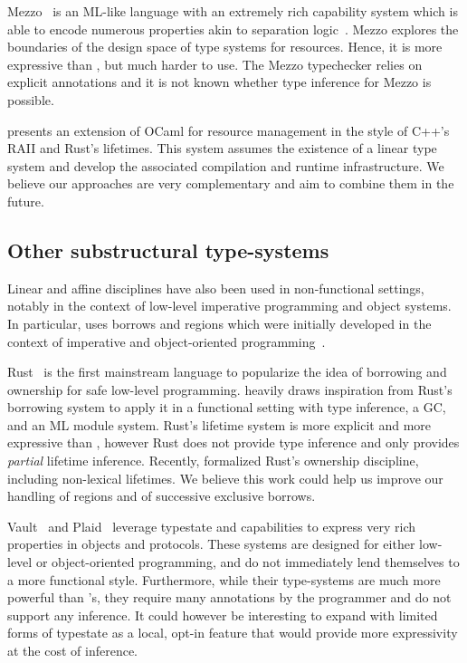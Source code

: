 Mezzo~\citep{DBLP:phd/hal/Protzenko14} is an ML-like language
with an extremely rich capability system which is able to encode numerous
properties akin to separation logic~\citep{DBLP:conf/lics/Reynolds02}.
Mezzo explores the  boundaries of the design space of type systems for
resources. Hence, it is more expressive than \lang, but
much harder to use. The Mezzo typechecker relies on explicit
annotations and it is not known whether type inference for Mezzo is possible.

\citet{DBLP:journals/corr/abs-1803-02796} presents
an extension of OCaml for resource management in the style of C++'s RAII
and Rust's lifetimes. This system assumes
the existence of a linear type system and develop the associated compilation
and runtime infrastructure. We believe our approaches are very
complementary and aim to combine them in the future.

\subsection{Other substructural type-systems}

Linear and affine disciplines have also been used in non-functional
settings, notably in the context of low-level imperative programming
and object systems. In particular, \lang uses borrows and regions
which were initially developed in the context of imperative and
object-oriented
programming~\citep{DBLP:conf/popl/BoylandR05,DBLP:conf/pldi/GrossmanMJHWC02}.

Rust~\citep{rust} is the first
mainstream language to popularize the idea of borrowing and ownership
for safe low-level programming.
\lang heavily draws inspiration from Rust's borrowing system to apply
it in a functional setting with type inference, a GC, and
an ML module system.
Rust's lifetime system is more explicit and more expressive than \lang,
however Rust does not provide type inference
and only provides \emph{partial} lifetime inference.
Recently, \citet{DBLP:journals/corr/abs-1903-00982}
formalized Rust's ownership discipline, including non-lexical lifetimes.
We believe this work
could help us improve our handling of regions and of successive exclusive borrows.

Vault~\citep{DBLP:conf/pldi/DeLineF01}
and Plaid~\citep{DBLP:conf/oopsla/AldrichSSS09}
leverage typestate and capabilities
to express very rich properties in objects and protocols.
These systems are designed for either low-level or object-oriented
programming, and do not immediately lend themselves to a more functional
style. Furthermore, while their type-systems are much more
powerful than \affe's, they require many annotations by the programmer
and do not support any inference.
It could however be interesting to expand \affe with limited
forms of typestate as a local, opt-in feature that would provide
more expressivity at the cost of inference.

